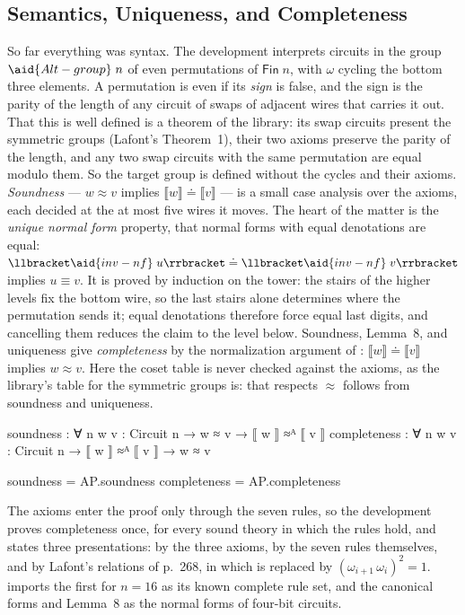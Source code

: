 \subsection{Semantics, Uniqueness, and Completeness}\label{sec:case-semantics}

So far everything was syntax. The development interprets circuits in the group $\aid{Alt-group}\;n$ of even permutations of $\mathsf{Fin}\;n$, with $\omega$ cycling the bottom three elements. A permutation is even if its \emph{sign} is false, and the sign is the parity of the length of any circuit of swaps of adjacent wires that carries it out. That this is well defined is a theorem of the library: its swap circuits present the symmetric groups (Lafont's Theorem~1), their two axioms preserve the parity of the length, and any two swap circuits with the same permutation are equal modulo them. So the target group is defined without the cycles and their axioms. \emph{Soundness} --- $w \approx v$ implies $\llbracket w\rrbracket \doteq \llbracket v\rrbracket$ --- is a small case analysis over the axioms, each decided at the at most five wires it moves. The heart of the matter is the \emph{unique normal form} property, that normal forms with equal denotations are equal: $\llbracket \aid{inv-nf}\;u \rrbracket \doteq \llbracket \aid{inv-nf}\;v \rrbracket$ implies $u \equiv v$. It is proved by induction on the tower: the stairs of the higher levels fix the bottom wire, so the last stairs alone determines where the permutation sends it; equal denotations therefore force equal last digits, and cancelling them reduces the claim to the level below. Soundness, Lemma~8, and uniqueness give \emph{completeness} by the normalization argument of : $\llbracket w\rrbracket \doteq \llbracket v\rrbracket$ implies $w \approx v$. Here the coset table is never checked against the axioms, as the library's table for the symmetric groups is: that  respects $\approx$ follows from soundness and uniqueness.
\begin{code}
soundness : ∀ {n} {w v : Circuit n} → w ≈ v → ⟦ w ⟧ ≈ᴬ ⟦ v ⟧
completeness : ∀ {n} {w v : Circuit n} → ⟦ w ⟧ ≈ᴬ ⟦ v ⟧ → w ≈ v
\end{code}
\begin{code}[hide]
soundness = AP.soundness
completeness = AP.completeness
\end{code}

The axioms enter the proof only through the seven rules, so the development proves completeness once, for every sound theory in which the rules hold, and states three presentations: by the three axioms, by the seven rules themselves, and by Lafont's relations of p.~268, in which  is replaced by $(\omega_{i+1}\,\omega_i)^2=1$.  imports the first for $n=16$ as its known complete rule set, and the canonical forms and Lemma~8 as the normal forms of four-bit circuits.

\FloatBarrier

